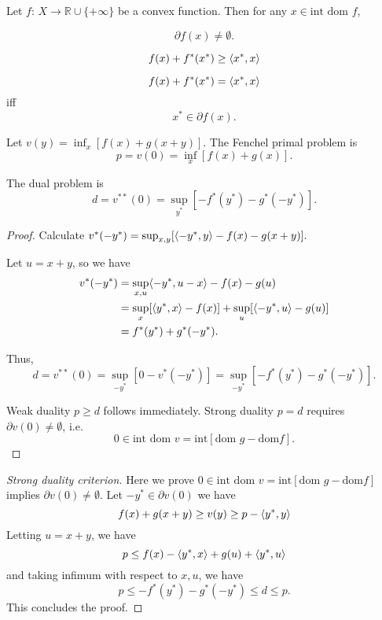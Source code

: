 \begin{corollary}
	Let $f:\,X\to \mathbb{R}\cup \{+\infty\}$ be a convex function. Then for any $x\in \textrm{int dom }f$,
	
	$$ \partial f(x)\neq \emptyset.$$
\end{corollary}

\begin{theorem}
	$$f(x)+f^{*}(x^{*})\geq \ang*{x^{*},x}$$
\end{theorem}

\begin{corollary}
	$$f(x)+f^{*}(x^{*})= \ang*{x^{*},x}$$ iff
	$$x^{*}\in \partial f(x).$$
\end{corollary}

\begin{theorem}
	Let $v(y) = \inf_x [f(x)+g(x+y)].$ The Fenchel primal problem is
	$$p = v(0) = \inf_x [f(x)+g(x)].$$
	
	The dual problem is
	$$d = v^{**}(0)=\sup_{y^{*}} [-f^{*}(y^{*})-g^{*}(-y^{*})].$$
\end{theorem}

\begin{proof}
	Calculate $v^{*}(-y^{*}) = \sup_{x,y}[\ang*{-y^{*},y}-f(x)-g(x+y)].$
	
	Let $u = x+y$, so we have
	\begin{align*}
	v^{*}(-y^{*}) &= \sup_{x,u} \ang*{-y^{*},u-x} - f(x) - g(u) \\
	&= \sup_x [\ang*{y^{*},x}-f(x)]+\sup_u [\ang*{-y^{*},u}-g(u)] \\
	&= f^{*}(y^{*}) + g^{*}(-y^{*}).
	\end{align*}
	
	Thus,
	$$d = v^{**}(0) = \sup_{-y^{*}}[0 - v^{*}(-y^{*})] = \sup_{-y^{*}}[-f^{*}(y^{*})-g^{*}(-y^{*})].$$
	
	Weak duality $p\geq d$ follows immediately. Strong duality $p=d$ requires $\partial v(0)\neq \emptyset$, i.e.
	$$0\in \textrm{int dom }v = \textrm{int}[\textrm{dom } g-\textrm{dom} f].$$
\end{proof}

\begin{proof}[Strong duality criterion]
	Here we prove $0\in \textrm{int dom }v = \textrm{int}[\textrm{dom } g-\textrm{dom} f]$ implies $\partial v(0)\neq \emptyset$. Let $-y^{*}\in \partial v(0)$ we have
	$$
	f(x)+g(x+y)\geq v(y)\geq p-\ang*{y^{*},y}
	$$
	Letting $u=x+y$, we have
	$$p\leq f(x)-\ang*{y^{*},x}+g(u)+\ang*{y^{*},u}
	$$ and taking infimum with respect to $x,u$, we have
	$$
	p\leq -f^{*}(y^{*})-g^{*}(-y^{*})\leq d\leq p.
	$$
	This concludes the proof.
\end{proof}

